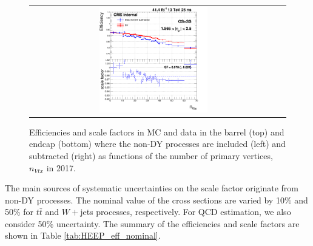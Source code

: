 \begin{figure}[bh]
\begin{center}
\begin{tabular}{cc}
      \includegraphics[width=0.45\textwidth]{figures/Zprime/2017/ScaleFactor/SameSign/nominal/g_compare_cut_nVtx_Endcap_ea_ta_exc_AS_nominal_PUW.png}
    \end{tabular}
    \caption{Efficiencies and scale factors in MC and data in the barrel (top) and endcap (bottom) where the non-DY processes are included (left) and subtracted (right) as functions of the number of primary vertices, $n_{Vtx}$ in 2017.}
    \label{fig:eff_SS_nominal_nVtx_2017}
  \end{center}
\end{figure}

\clearpage

The main sources of systematic uncertainties on the scale factor originate from non-DY processes.
The nominal value of the cross sections are varied by 10\% and 50\% for $t\bar{t}$ and $W+$jets processes, respectively.
For QCD estimation, we also consider 50\% uncertainty.
The summary of the efficiencies and scale factors are shown in Table \ref{tab:HEEP_eff_nominal}.

